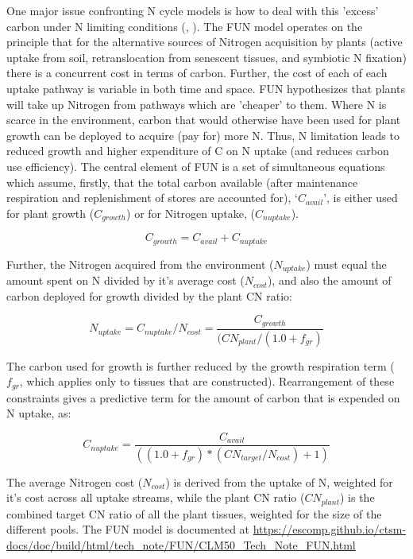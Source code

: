 \documentclass[draft,linenumbers]{agujournal}
\begin{document}
One major issue confronting N cycle models is how to deal with this 'excess' carbon under N limiting conditions (\cite{zaehle2010}, \cite{dekauwe2014}). The FUN model operates on the principle that for the alternative sources of Nitrogen acquisition by plants (active uptake from soil, retranslocation from senescent tissues, and symbiotic N fixation) there is a concurrent cost in terms of carbon. Further, the cost of each of each uptake pathway is variable in both time and space. FUN hypothesizes that plants will take up Nitrogen from pathways which are 'cheaper' to them. Where N is scarce in the environment, carbon that would otherwise have been used for plant growth can be deployed to acquire (pay for) more N. Thus, N limitation leads to reduced growth and higher expenditure of C on N uptake (and reduces carbon use efficiency).  The central element of FUN is a set of simultaneous equations which assume, firstly, that the total carbon available (after maintenance respiration and replenishment of stores are accounted for), `$C_{avail}$', is either used for plant growth ($C_{growth}$) or for Nitrogen uptake, ($C_{nuptake}$).

\begin{equation}
C_{growth}=C_{avail}+C_{nuptake}
\end{equation}

Further, the Nitrogen acquired from the environment ($N_{uptake}$) must equal the amount spent on N divided by it's average cost ($N_{cost}$), and also the amount of carbon deployed for growth divided by the plant CN ratio:


\begin{equation}
N_{uptake}=C_{nuptake}/N_{cost} =\frac{C_{growth}}{(CN_{plant}/(1.0+f_{gr})}
\end{equation}

The carbon used for growth is further reduced by the growth respiration term ($f_{gr}$, which applies only to tissues that are constructed). Rearrangement of these constraints gives a predictive term for the amount of carbon that is expended on N uptake, as:

\begin{equation}
C_{nuptake} =\frac{C_{avail}}{ ( (1.0+f_{gr})*(CN_{target} / N_{cost}) + 1) }
\end{equation}


The average Nitrogen cost ($N_{cost}$) is derived from the uptake of N, weighted for it's cost across all uptake streams, while the plant CN ratio ($CN_{plant}$) is the combined target CN ratio of all the plant tissues, weighted for the size of the different pools. The FUN model is documented at \url{https://escomp.github.io/ctsm-docs/doc/build/html/tech_note/FUN/CLM50_Tech_Note_FUN.html}
\end{document}
